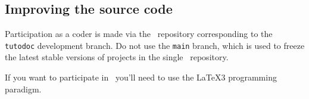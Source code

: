 \documentclass[12pt, a4paper]{tutodoc}
\begin{document}

\subsection{Improving the source code}

Participation as a coder is made via the \thisrepo\ repository corresponding to the \verb#tutodoc# development branch.
Do not use the \verb#main# branch, which is used to freeze the latest stable versions of projects in the single \thismonorepo\ repository.


\begin{tdocimp}
	If you want to participate in \thisproj\, you'll need to use the \LaTeX3 programming paradigm.
\end{tdocimp}
\end{document}
